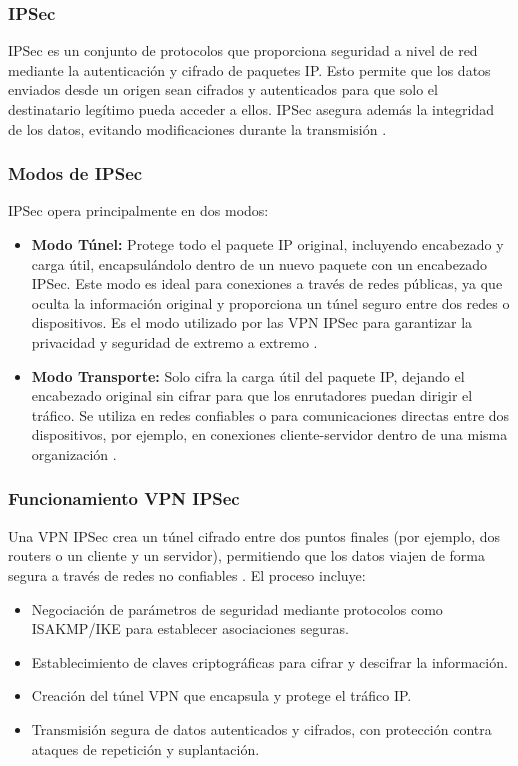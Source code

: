\subsubsection{IPSec}
\acs{IPSec} es un conjunto de protocolos que proporciona seguridad a nivel de red mediante la autenticación y cifrado de paquetes \acs{IP}. Esto permite que los datos enviados desde 
un origen sean cifrados y autenticados para que solo el destinatario legítimo pueda acceder a ellos. \acs{IPSec} asegura además la integridad de los datos, evitando modificaciones 
durante la transmisión \cite{ipsec}.
\subsubsection{Modos de IPSec}
\acs{IPSec} opera principalmente en dos modos:
\begin{itemize}
    \item \textbf{Modo Túnel:} Protege todo el paquete \acs{IP} original, incluyendo encabezado y carga útil, encapsulándolo dentro de un nuevo paquete con un encabezado \acs{IPSec}. 
    Este modo es ideal para conexiones a través de redes públicas, ya que oculta la información original y proporciona un túnel seguro entre dos redes o dispositivos. 
    Es el modo utilizado por las \acs{VPN} \acs{IPSec} para garantizar la privacidad y seguridad de extremo a extremo \cite{ipsec}.
    \item \textbf{Modo Transporte:} Solo cifra la carga útil del paquete \acs{IP}, dejando el encabezado original sin cifrar para que los enrutadores puedan dirigir el tráfico. 
    Se utiliza en redes confiables o para comunicaciones directas entre dos dispositivos, por ejemplo, en conexiones cliente-servidor dentro de una misma organización \cite{ipsec}.
\end{itemize}
\subsubsection{Funcionamiento VPN IPSec}
Una \acs{VPN} \acs{IPSec} crea un túnel cifrado entre dos puntos finales (por ejemplo, dos routers o un cliente y un servidor), permitiendo que los datos viajen de forma segura a través de redes 
no confiables \cite{ipsec}. El proceso incluye:
\begin{itemize}
    \item Negociación de parámetros de seguridad mediante protocolos como ISAKMP/IKE para establecer asociaciones seguras.
    \item Establecimiento de claves criptográficas para cifrar y descifrar la información.
    \item Creación del túnel \acs{VPN} que encapsula y protege el tráfico \acs{IP}.
    \item Transmisión segura de datos autenticados y cifrados, con protección contra ataques de repetición y suplantación.
\end{itemize}

